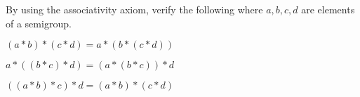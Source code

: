 By using the associativity axiom, verify the following where
$a, b, c, d$ are elements of a semigroup.
\begin{myenum}
\item $(a * b) * (c * d) = a * (b * (c * d))$
\item $a * ((b * c) * d) = (a * (b * c)) * d$
\item $((a * b) * c) * d = (a * b) * (c * d)$
\end{myenum}
